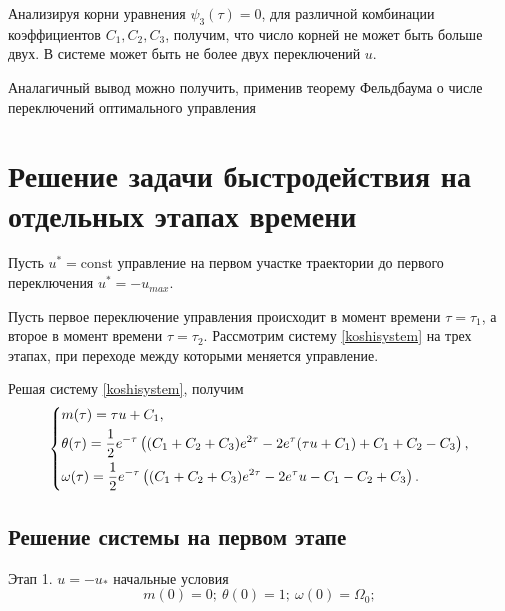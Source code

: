 \documentclass[a4paper,12pt, openany]{book}
\theoremstyle{plain} %
\theoremstyle{definition} %
\theoremstyle{remark} %
\numberwithin{equation}{chapter}
\begin{document}
{Анализируя корни уравнения $\psi_3(\tau)=0$, для различной комбинации
коэффициентов $C_1,C_2,C_3$, получим, что число корней не может быть больше двух. В системе может быть не более двух переключений $u$.

Аналагичный вывод можно получить, применив теорему Фельдбаума о числе переключений оптимального управления\cite{feldbaum}



\section{Решение задачи быстродействия на отдельных этапах времени}
Пусть $u^*=\mathrm{const}$ управление на первом участке траектории до первого переключения $u^*=-u_{max}$.

Пусть первое переключение управления происходит в момент времени
$\tau=\tau_1$, а второе в момент времени
$\tau=\tau_2$. Рассмотрим систему \eqref{koshisystem} на трех этапах,
при переходе между которыми меняется управление.

Решая систему \eqref{koshisystem}, получим
\begin{equation}\label{solvekoshi}
    \left\{ {\begin{aligned}
                 & m(\tau) = \tau u+C_1, \hfill                                                            \\
                 & \theta(\tau) = \frac{1}{2} e^{-\tau } \left((C_1+C_2+C_3) e^{2 \tau }-2 e^{\tau } (\tau
                u+C_1)+C_1+C_2-C_3\right), \hfill                                                          \\
                 & \omega(\tau) = \frac{1}{2} e^{-\tau } \left((C_1+C_2+C_3) e^{2 \tau }-2 e^{\tau }
                u-C_1-C_2+C_3\right). \hfill                                                               \\
            \end{aligned}} \right.
\end{equation}

\subsection{Решение системы на первом этапе}
Этап 1. $u=-u_*$ начальные условия
\[
    m(0)=0;\ \theta(0)=1;\ \omega(0)=\Omega_0;
\]

}
\end{document}

